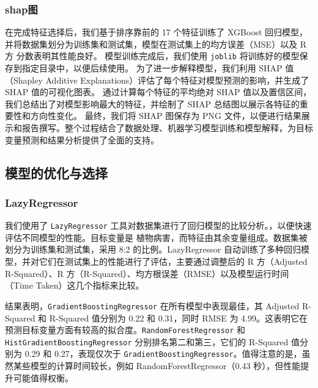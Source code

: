 \documentclass[AutoFakeBold]{LZUThesis-PgD&PhD}
\begin{document}
	\subsubsection{shap图}
	在完成特征选择后，我们基于排序靠前的 17 个特征训练了 XGBoost 回归模型，并将数据集划分为训练集和测试集，模型在测试集上的均方误差（MSE）以及 R 方 分数表明其性能良好。
	模型训练完成后，我们使用 \texttt{joblib} \cite{joblib} 将训练好的模型保存到指定目录中，以便后续使用。
	为了进一步解释模型，我们利用 SHAP 值（Shapley Additive Explanations）评估了每个特征对模型预测的影响，并生成了 SHAP 值的可视化图表。
	通过计算每个特征的平均绝对 SHAP 值以及置信区间，我们总结出了对模型影响最大的特征，并绘制了 SHAP 总结图以展示各特征的重要性和方向性变化。
	最终，我们将 SHAP 图保存为 PNG 文件，以便进行结果展示和报告撰写。整个过程结合了数据处理、机器学习模型训练和模型解释，为目标变量预测和结果分析提供了全面的支持。
	
	
	
%		
	
	\subsection{模型的优化与选择}
	\subsubsection{LazyRegressor}
	
	我们使用了 \texttt{LazyRegressor} \cite{lazyregressor} 工具对数据集进行了回归模型的比较分析。，以便快速评估不同模型的性能。目标变量是 植物病害，而特征由其余变量组成。数据集被划分为训练集和测试集，采用 8:2 的比例。LazyRegressor 自动训练了多种回归模型，并对它们在测试集上的性能进行了评估，主要通过调整后的 R 方（Adjusted R-Squared）、R 方（R-Squared）、均方根误差（RMSE）以及模型运行时间（Time Taken）这几个指标来比较。
	
	结果表明，\texttt{GradientBoostingRegressor} \cite{gradientboosting} 在所有模型中表现最佳，其 Adjusted R-Squared 和 R-Squared 值分别为 0.22 和 0.31，同时 RMSE 为 4.99。这表明它在预测目标变量方面有较高的拟合度。\texttt{RandomForestRegressor} \cite{randomforest} 和 \texttt{HistGradientBoostingRegressor} \cite{histgradientboosting} 分别排名第二和第三，它们的 R-Squared 值分别为 0.29 和 0.27，表现仅次于 \texttt{GradientBoostingRegressor}。值得注意的是，虽然某些模型的计算时间较长，例如 RandomForestRegressor（0.43 秒），但性能提升可能值得权衡。
\end{document}
